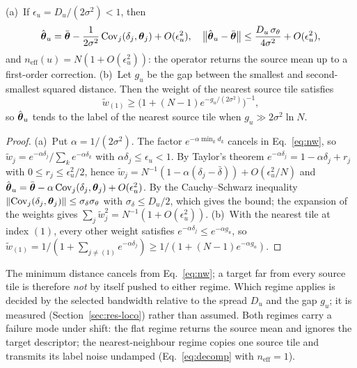\begin{proposition}
\label{prop:regimes}
(a)~If $\epsilon_u=D_u/(2\sigma^{2})<1$, then
\begin{equation}
\hat{\boldsymbol{\theta}}_u=\bar{\boldsymbol{\theta}}-\frac{1}{2\sigma^{2}}\operatorname{Cov}_j(\delta_j,\boldsymbol{\theta}_j)+O(\epsilon_u^{2}),\quad
\bigl\lVert\hat{\boldsymbol{\theta}}_u-\bar{\boldsymbol{\theta}}\bigr\rVert\le
\frac{D_u\,\sigma_\theta}{4\sigma^{2}}+O(\epsilon_u^{2}),
\label{eq:flat}
\end{equation}
and $n_{\mathrm{eff}}(u)=N(1+O(\epsilon_u^{2}))$: the operator returns the
source mean up to a first-order correction.
(b)~Let $g_u$ be the gap between the smallest and second-smallest squared
distance. Then the weight of the nearest source tile satisfies
\begin{equation}
\tilde w_{(1)}\ge\bigl(1+(N-1)e^{-g_u/(2\sigma^{2})}\bigr)^{-1},
\label{eq:nn}
\end{equation}
so $\hat{\boldsymbol{\theta}}_u$ tends to the label of the nearest source tile when
$g_u\gg2\sigma^{2}\ln N$.
\end{proposition}
\begin{proof}
(a)~Put $\alpha=1/(2\sigma^{2})$. The factor $e^{-\alpha\min_k d_k}$
cancels in Eq.~\eqref{eq:nw}, so
$\tilde w_j=e^{-\alpha\delta_j}/\sum_k e^{-\alpha\delta_k}$ with
$\alpha\delta_j\le\epsilon_u<1$. By Taylor's theorem
$e^{-\alpha\delta_j}=1-\alpha\delta_j+r_j$ with $0\le r_j\le\epsilon_u^{2}/2$,
hence $\tilde w_j=N^{-1}(1-\alpha(\delta_j-\bar\delta))+O(\epsilon_u^{2}/N)$
and $\hat{\boldsymbol{\theta}}_u=\bar{\boldsymbol{\theta}}-\alpha\operatorname{Cov}_j(\delta_j,\boldsymbol{\theta}_j)+O(\epsilon_u^{2})$.
By the Cauchy--Schwarz inequality
$\lVert\operatorname{Cov}_j(\delta_j,\boldsymbol{\theta}_j)\rVert\le\sigma_\delta\sigma_\theta$ with
$\sigma_\delta\le D_u/2$, which gives the bound; the expansion of the
weights gives $\sum_j\tilde w_j^{2}=N^{-1}(1+O(\epsilon_u^{2}))$.
(b)~With the nearest tile at index $(1)$, every other weight satisfies
$e^{-\alpha\delta_j}\le e^{-\alpha g_u}$, so
$\tilde w_{(1)}=1/(1+\sum_{j\ne(1)}e^{-\alpha\delta_j})\ge1/(1+(N-1)e^{-\alpha g_u})$.
\end{proof}

\noindent The minimum distance cancels from Eq.~\eqref{eq:nw}; a target
far from every source tile is therefore \emph{not} by itself pushed to
either regime. Which regime applies is decided by the selected bandwidth
relative to the spread $D_u$ and the gap $g_u$; it is measured
(Section~\ref{sec:res-loco}) rather than assumed. Both regimes carry a
failure mode under shift: the flat regime returns the source mean and
ignores the target descriptor; the nearest-neighbour regime copies one
source tile and transmits its label noise undamped
(Eq.~\eqref{eq:decomp} with $n_{\mathrm{eff}}=1$).

